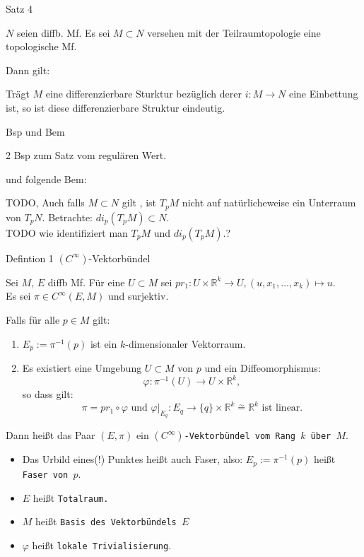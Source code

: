 \documentclass[a6paper,11pt,grid=front]{kartei}
\newcommand{\fl}[1]{\begin{flushleft}
 #1 \end{flushleft}}
\newcommand{\R}{\mathbb{R}}
\begin{document}
\nonameyet
{Satz 4} {}
{
$N$ seien diffb. Mf. Es sei $M \subset N$ versehen mit der Teilraumtopologie
eine topologische Mf.
\fl{Dann gilt:}
\fl{Trägt $M$ eine differenzierbare Sturktur bezüglich derer $i: M \to N$ eine 
		Einbettung ist, so ist diese differenzierbare Struktur eindeutig.}
}
{}

\nonameyet
{Bsp und Bem} {}
{
2 Bsp zum Satz vom regulären Wert.
\fl{und folgende Bem:}
TODO, Auch falls $M \subset N$ gilt , ist $T_pM$ nicht auf natürlicheweise
ein Unterraum von $T_pN$. 
Betrachte: $di_p(T_pM) \subset N$. 
\\
TODO wie identifiziert man $T_pM$ und $di_p(T_pM)$.?
}
{}


\nonameyet
{Defintion 1} {$(C^\infty)$-Vektorbündel}
{
\scriptsize
Sei $M$, $E$ diffb Mf. 
Für eine $U \subset M$ sei
$pr_1 : U \times \R^k \to U, (u,x_1,\dots,x_k) \mapsto u$.
\\
Es sei $\pi\in C^\infty(E,M)$ und surjektiv.
\fl{Falls für alle $p\in M$ gilt:}
\begin{enumerate}[1.]
\item $E_p := \pi^ {-1}(p)$ ist ein $k$-dimensionaler Vektorraum.  
\item Es existiert eine Umgebung $U\subset M$ von $p$ und ein 
Diffeomorphismus: 
\[
\varphi: \pi^ {-1}(U) \to U \times \R^k,
\]
so dass gilt:
\[
\pi = pr_1 \circ \varphi
\text{ und }
\varphi|_{E_q}: E_q \to \{ q\} \times \R^k \overset{\sim}{=} \R^k 
\text{ ist linear.}
\]
\end{enumerate}

\fl{Dann heißt das Paar $(E,\pi)$ ein \texttt{$(C^\infty)$-Vektorbündel vom 
Rang $k$ über $M$}.}

\tiny
\begin{itemize}[-]
\item Das Urbild eines(!) Punktes heißt auch Faser, also: 
$E_p := \pi^ {-1}(p)$ heißt \texttt{Faser von $p$}. 
\item $E$ heißt \texttt{Totalraum.}
\item $M$ heißt \texttt{Basis des Vektorbündels $E$}
\item $\varphi$ heißt \texttt{lokale Trivialisierung}.
\end{itemize}
}
{}

\end{document}
